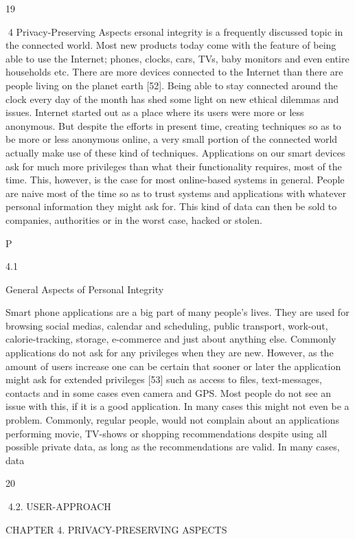 19

4
Privacy-Preserving Aspects
ersonal integrity is a frequently discussed topic in the connected world.
Most new products today come with the feature of being able to use the Internet; phones, clocks, cars, TVs, baby monitors and even entire households etc.
There are more devices connected to the Internet than there are people living
on the planet earth [52]. Being able to stay connected around the clock every day of
the month has shed some light on new ethical dilemmas and issues. Internet started
out as a place where its users were more or less anonymous. But despite the efforts in
present time, creating techniques so as to be more or less anonymous online, a very small
portion of the connected world actually make use of these kind of techniques. Applications on our smart devices ask for much more privileges than what their functionality
requires, most of the time. This, however, is the case for most online-based systems in
general. People are naive most of the time so as to trust systems and applications with
whatever personal information they might ask for. This kind of data can then be sold
to companies, authorities or in the worst case, hacked or stolen.

P

4.1

General Aspects of Personal Integrity

Smart phone applications are a big part of many people’s lives. They are used for browsing social medias, calendar and scheduling, public transport, work-out, calorie-tracking,
storage, e-commerce and just about anything else. Commonly applications do not ask
for any privileges when they are new. However, as the amount of users increase one
can be certain that sooner or later the application might ask for extended privileges [53]
such as access to files, text-messages, contacts and in some cases even camera and GPS.
Most people do not see an issue with this, if it is a good application. In many cases this
might not even be a problem. Commonly, regular people, would not complain about an
applications performing movie, TV-shows or shopping recommendations despite using
all possible private data, as long as the recommendations are valid. In many cases, data

20

4.2. USER-APPROACH

CHAPTER 4. PRIVACY-PRESERVING ASPECTS

